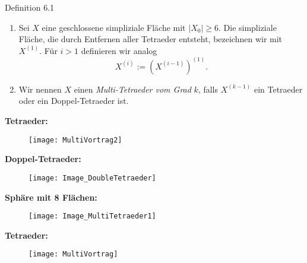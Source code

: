 \documentclass{beamer}
\begin{document}
\begin{frame}
\begin{block}{Definition 6.1}
\begin{enumerate}
\item Sei $X$ eine geschlossene simpliziale Fläche mit $\vert X_0\vert \geq 6.$
 Die simpliziale Fläche, die durch Entfernen aller Tetraeder entsteht, bezeichnen wir mit $X^{(1)}$. Für $i>1$ definieren wir analog 
\[
X^{(i)}:=(X^{(i-1)})^{(1)}.
\]
\item Wir nennen $X$ einen \emph{Multi-Tetraeder vom Grad} $k$, falls $X^{(k-1)}$ ein Tetraeder oder ein Doppel-Tetraeder ist.
\end{enumerate}
\end{block}
\end{frame}
\begin{frame}
\textbf{Tetraeder:}
\begin{figure}[H]
\begin{center}
\texttt{[image: MultiVortrag2]}
\end{center}
\end{figure}
\end{frame}
\begin{frame}
\textbf{Doppel-Tetraeder:}
\begin{figure}[H]
\begin{center}
\texttt{[image: Image\_DoubleTetraeder]}
\end{center}
\end{figure}
\end{frame}
\begin{frame}
\textbf{Sphäre mit 8 Flächen:}
\begin{figure}[H]
\begin{center}
\texttt{[image: Image\_MultiTetraeder1]}
\end{center}
\end{figure}
\end{frame}
\begin{frame}
\textbf{Tetraeder:}
\begin{figure}[H]
\begin{center}
\texttt{[image: MultiVortrag]}
\end{center}
\end{figure}
\end{frame}
\end{document}
